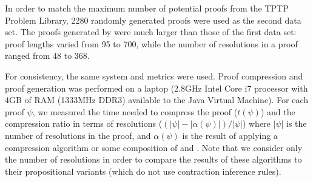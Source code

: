 {In order to match the maximum number of potential proofs from the TPTP Problem Library, 2280 randomly generated proofs were used as the second data set. The proofs generated by were much larger than those of the first data set: proof lengths varied from 95 to 700, while the number of resolutions in a proof ranged from 48 to 368.

For consistency, the same system and metrics were used. Proof compression and proof generation was performed on a laptop (2.8GHz Intel Core i7 processor with 4GB of RAM (1333MHz DDR3) available to the Java Virtual Machine). For each proof $\psi$, we measured the time needed to compress the proof ($t(\psi)$) and the compression ratio in terms of resolutions ($(|\psi|-|\alpha(\psi)|)/|\psi|$) where $|\psi|$ is the number of resolutions in the proof, and $\alpha(\psi)$ is the result of applying a compression algorithm or some composition of {\FORPI} and {\GFOLU}. Note that we consider only the number of resolutions in order to compare the results of these algorithms to their propositional variants (which do not use contraction inference rules).



}
